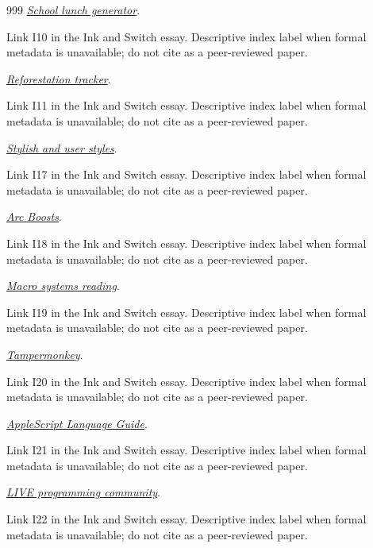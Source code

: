 \documentclass[11pt,letterpaper]{article}
\begin{document}
\begin{thebibliography}{999}
\href{https://www.nytimes.com/2025/02/27/technology/personaltech/vibecoding-ai-software-programming.html}{\emph{School lunch generator}}.
\par {\small Link I10 in the Ink and Switch essay. Descriptive index label when formal metadata is unavailable; do not cite as a peer-reviewed paper.}

\href{https://www.wsj.com/tech/ai/your-next-favorite-app-the-one-you-make-yourself-a6a84f5f}{\emph{Reforestation tracker}}.
\par {\small Link I11 in the Ink and Switch essay. Descriptive index label when formal metadata is unavailable; do not cite as a peer-reviewed paper.}

\href{https://userstyles.org/}{\emph{Stylish and user styles}}.
\par {\small Link I17 in the Ink and Switch essay. Descriptive index label when formal metadata is unavailable; do not cite as a peer-reviewed paper.}

\href{https://resources.arc.net/hc/en-us/articles/19212718608151-Boosts-Customize-Any-Website}{\emph{Arc Boosts}}.
\par {\small Link I18 in the Ink and Switch essay. Descriptive index label when formal metadata is unavailable; do not cite as a peer-reviewed paper.}

\href{https://citeseerx.ist.psu.edu/document?repid=rep1&type=pdf&doi=7eb0bba253a1d494544a15c3df921dd5a8f2401f}{\emph{Macro systems reading}}.
\par {\small Link I19 in the Ink and Switch essay. Descriptive index label when formal metadata is unavailable; do not cite as a peer-reviewed paper.}

\href{https://www.tampermonkey.net/}{\emph{Tampermonkey}}.
\par {\small Link I20 in the Ink and Switch essay. Descriptive index label when formal metadata is unavailable; do not cite as a peer-reviewed paper.}

\href{https://developer.apple.com/library/archive/documentation/AppleScript/Conceptual/AppleScriptLangGuide/reference/ASLR_cmds.html}{\emph{AppleScript Language Guide}}.
\par {\small Link I21 in the Ink and Switch essay. Descriptive index label when formal metadata is unavailable; do not cite as a peer-reviewed paper.}

\href{https://liveprog.org/}{\emph{LIVE programming community}}.
\par {\small Link I22 in the Ink and Switch essay. Descriptive index label when formal metadata is unavailable; do not cite as a peer-reviewed paper.}


\end{thebibliography}
\end{document}
